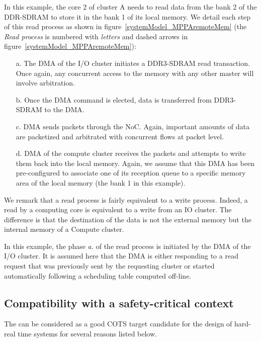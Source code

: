 \documentclass[main.tex]{subfiles}
\begin{document}
\begin{example}
    In this example, the core 2 of cluster A needs to read data from the bank 2
    of the DDR-SDRAM to store it in the bank 1 of its local memory. We detail
    each step of this read process as shown in
    figure~\ref{systemModel_MPPAremoteMem} (the \emph{Read process} is numbered
    with \emph{letters} and dashed arrows in
    figure~\ref{systemModel_MPPAremoteMem}):

    \begin{enumerate}
        \item[a.] The DMA of the I/O cluster initiates a DDR3-SDRAM read
            transaction. Once again, any concurrent access to the memory with
            any other master will involve arbitration.
        \item[b.] Once the DMA command is elected, data is transferred from
            DDR3-SDRAM to the DMA.
        \item[c.] DMA sends packets through the NoC. Again, important amounts
            of data are packetized and arbitrated with concurrent flows at
            packet level.
        \item[d.] DMA of the compute cluster receives the packets and attempts
            to write them back into the local memory. Again, we assume that
            this DMA has been pre-configured to associate one of its reception
            queue to a specific memory area of the local memory (the bank 1 in
            this example). 
    \end{enumerate}

    We remark that a read process is fairly equivalent to a write process.
    Indeed, a read by a computing core is equivalent to a write from an IO
    cluster. The difference is that the destination of the data is not the
    external memory but the internal memory of a Compute cluster.

    In this example, the phase \emph{a.} of the read process is initiated by
    the DMA of the I/O cluster. It is assumed here that the DMA is either
    responding to a read request that was previously sent by the requesting
    cluster or started automatically following a scheduling table computed
    off-line.
\end{example}


\subsection{Compatibility with a safety-critical context}
The \mppalong can be considered as a good COTS target candidate for the design
of hard-real time systems for several reasons listed below. 
\end{document}
